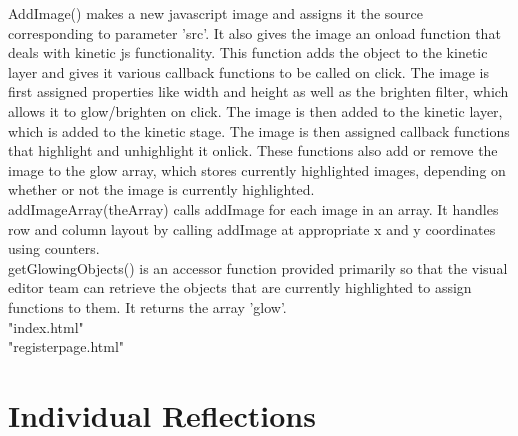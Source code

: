 \documentclass[12pt]{article}
\begin{document}
AddImage() makes a new javascript image and assigns it the source corresponding to parameter 'src'. It also gives the image an onload function that deals with kinetic js functionality. This function adds the object to the kinetic layer and gives it various callback functions to be called on click. The image is first assigned properties like width and height as well as the brighten filter, which allows it to glow/brighten on click. The image is then added to the kinetic layer, which is added to the kinetic stage. The image is then assigned callback functions that highlight and unhighlight it onlick. These functions also add or remove the image to the glow array, which stores currently highlighted images, depending on whether or not the image is currently highlighted. \\

addImageArray(theArray) calls addImage for each image in an array. It handles row and column layout by calling addImage at appropriate x and y coordinates using counters. \\

getGlowingObjects() is an accessor function provided primarily so that the visual editor team can retrieve the objects that are currently highlighted to assign functions to them. It returns the array 'glow'. \\

"index.html" \\

"registerpage.html" \\

\section{Individual Reflections}
\end{document}
